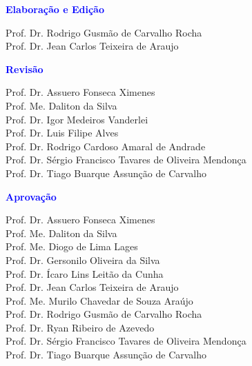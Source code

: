 
\begin{center}
  
    \textcolor{blue}{\bfseries \textsf{Elaboração e Edição}}
    
    Prof. Dr. Rodrigo Gusmão de Carvalho Rocha \\
    Prof. Dr. Jean Carlos Teixeira de Araujo \\
    
    \vspace*{32pt}
    
    \textcolor{blue}{\bfseries \textsf{Revisão}}
    
    Prof. Dr. Assuero Fonseca Ximenes \\
    Prof. Me. Daliton da Silva \\
    Prof. Dr. Igor Medeiros Vanderlei \\
    Prof. Dr. Luis Filipe Alves \\
    Prof. Dr. Rodrigo Cardoso Amaral de Andrade \\
    Prof. Dr. Sérgio Francisco Tavares de Oliveira Mendonça \\
    Prof. Dr. Tiago Buarque Assunção de Carvalho
    
    \vspace*{32pt}
    
    \textcolor{blue}{\bfseries \textsf{Aprovação}}
    
    Prof. Dr. Assuero Fonseca Ximenes \\
    Prof. Me. Daliton da Silva \\
    Prof. Me. Diogo de Lima Lages \\
    Prof. Dr. Gersonilo Oliveira da Silva \\
    Prof. Dr. Ícaro Lins Leitão da Cunha \\
    Prof. Dr. Jean Carlos Teixeira de Araujo \\
    Prof. Me. Murilo Chavedar de Souza Araújo \\
    Prof. Dr. Rodrigo Gusmão de Carvalho Rocha \\
    Prof. Dr. Ryan Ribeiro de Azevedo \\
    Prof. Dr. Sérgio Francisco Tavares de Oliveira Mendonça \\
    Prof. Dr. Tiago Buarque Assunção de Carvalho
    \end{center}
    
    \newpage